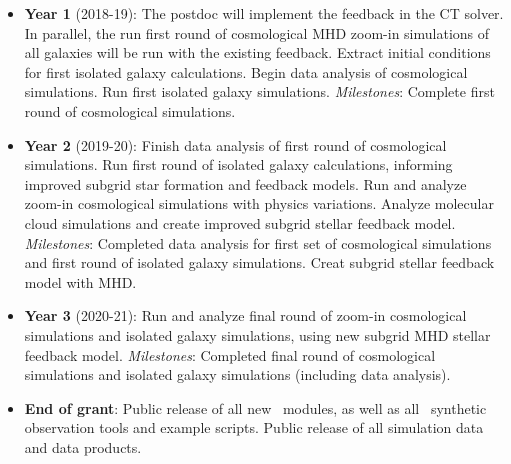 \begin{itemize}
\item{\textbf{Year 1} (2018-19): The postdoc will implement the feedback in the
CT solver.  In parallel, the run first round of cosmological MHD
zoom-in simulations of all galaxies will be run with the existing feedback.  Extract initial conditions for
first isolated galaxy calculations.  Begin data analysis of
cosmological simulations.  Run first isolated galaxy simulations.  
{\em Milestones}: Complete first round of cosmological simulations.  }

\item{\textbf{Year 2} (2019-20): Finish data analysis of first round
of cosmological simulations.  Run first round of isolated galaxy
calculations, informing improved subgrid star formation and feedback
models.  Run and analyze zoom-in cosmological simulations with physics
variations.  Analyze molecular cloud simulations and create improved
subgrid stellar feedback model.  {\em Milestones}: Completed data
analysis for first set of cosmological simulations and first round of
isolated galaxy simulations.  Creat subgrid stellar feedback model
with MHD.  }

\item{\textbf{Year 3} (2020-21): Run and analyze final round of
zoom-in cosmological simulations and isolated galaxy simulations,
using new subgrid MHD stellar feedback model.   {\em
Milestones}: Completed final round of cosmological simulations and
isolated galaxy simulations (including data analysis). }

\item{\textbf{End of grant}: Public release of all new \enzo\ modules,
as well as all \yt\ synthetic observation tools and example scripts.
Public release of all simulation data and data products.}

\end{itemize}

\vspace{-3mm}
